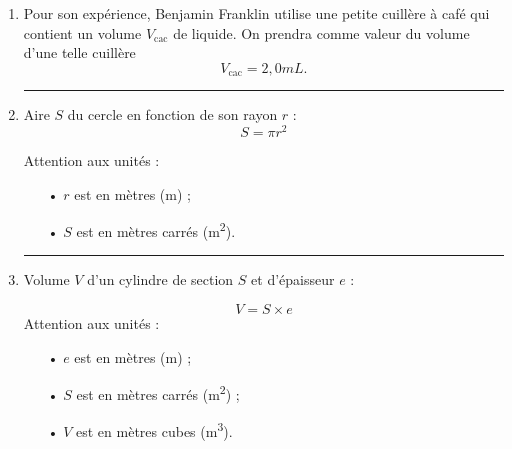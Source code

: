 \documentclass[12pt,a4paper]{article}
\begin{document}
\begin{enumerate}
\item Pour son expérience, Benjamin Franklin utilise une petite cuillère à café qui contient un volume $V_\mathrm{cac}$ de liquide.
On prendra comme valeur du volume d'une telle cuillère
\[
V_\mathrm{cac} = \unit{2{,}0}{mL}.
\]

\hrule{}
\vspace{5pt}
\item 
\begin{multicols}{2}
Aire $S$ du cercle en fonction de son rayon $r$ :
\[
S = \pi r^2
\]

Attention aux unités :
\begin{itemize}
\item[•] $r$ est en mètres (m) ;
\item[•] $S$ est en mètres carrés (m\textsuperscript{2}).
\end{itemize}
\hfill

\begin{center}
\end{center}
\end{multicols}

\hrule{}
\vspace{5pt}
\item Volume $V$ d'un cylindre de section $S$ et d'épaisseur $e$ :
\begin{multicols}{2}
\[
V = S \times e
\]
Attention aux unités :
\begin{itemize}
\item[•] $e$ est en mètres (m) ;
\item[•] $S$ est en mètres carrés (m\textsuperscript{2}) ;
\item[•] $V$ est en mètres cubes (m\textsuperscript{3}).
\end{itemize}
\hfill

\hfill
\begin{center}
\end{center}
\end{multicols}


\end{enumerate}
\end{document}
